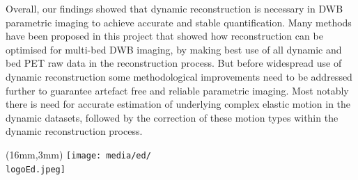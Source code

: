 {Overall, our findings showed that dynamic reconstruction is necessary in DWB parametric imaging to achieve accurate and stable quantification. Many methods have been proposed in this project that showed how reconstruction can be optimised for multi-bed DWB imaging, by making best use of all dynamic and bed PET raw data in the reconstruction process. But before widespread use of dynamic reconstruction some methodological improvements need to be addressed further to guarantee artefact free and reliable parametric imaging. Most notably there is need for accurate estimation of underlying complex elastic motion in the dynamic datasets, followed by the correction of these motion types within the dynamic reconstruction process.}															%

\label{layout_last}

\pagestyle{empty}

\begin{textblock*}{61mm}(16mm,3mm)
	\noindent\texttt{[image: media/ed/\\logoEd.jpeg]}
\end{textblock*}



